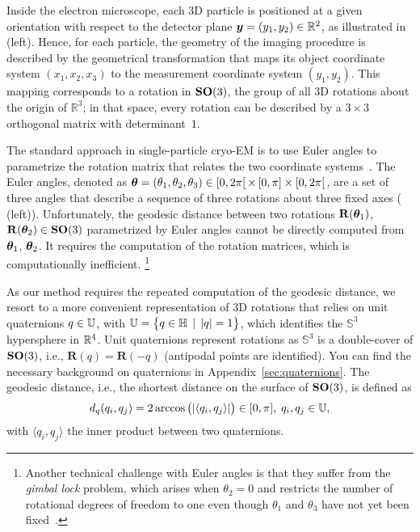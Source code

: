 Inside the electron microscope, each 3D particle is positioned at a given orientation with respect to the detector plane ${\boldsymbol{y}}=(y_1,y_2)\in \mathbb{R}^2$, as illustrated in  (left). Hence, for each particle, the geometry of the imaging procedure is described by the geometrical transformation that maps its object coordinate system $(x_1,x_2,x_3)$ to the measurement coordinate system $(y_1,y_2)$. This mapping corresponds to a rotation in $\mathrm{\mathbf{SO}}(3)$, the group of all 3D rotations about the origin of $\mathbb{R}^3$; in that space, every rotation can be described by a $3\times3$ orthogonal matrix with determinant~$1$.

The standard approach in single-particle cryo-EM is to use Euler angles to parametrize the rotation matrix that relates the two coordinate systems~\cite{sorzano2014interchanging}.
The Euler angles, denoted as ${\boldsymbol{\theta}} = (\theta_1,\theta_2,\theta_3) \in [0,2\pi[ \, \times \, [0,\pi] \times [0,2\pi[$, are a set of three angles that describe a sequence of three rotations about three fixed axes ( (left)).
Unfortunately, the geodesic distance between two rotations $\mathbf{R}({\boldsymbol{\theta}}_1)$, $\mathbf{R}({\boldsymbol{\theta}}_2)\in \mathrm{\mathbf{SO}}(3)$ parametrized by Euler angles cannot be directly computed from ${\boldsymbol{\theta}}_1$, ${\boldsymbol{\theta}}_2$.
It requires the computation of the rotation matrices, which is computationally inefficient.%
\footnote{Another technical challenge with Euler angles is that they suffer from the \textit{gimbal lock} problem, which arises when $\theta_2=0$ and restricts the number of rotational degrees of freedom to one even though $\theta_1$ and $\theta_3$ have not yet been fixed~\cite{koks2006explorations}.}

As our method requires the repeated computation of the geodesic distance, we resort to a more convenient representation of 3D rotations that relies on unit quaternions $q \in \mathbb{U}$, with  $\mathbb{U} = \big\{ q \in \mathbb{H} \; \, | \; \, \lvert q \rvert = 1 \big\}$, which identifies the $\mathbb{S}^3$ hypersphere in $\mathbb{R}^4$.
Unit quaternions represent rotations as $\mathbb{S}^3$ is a double-cover of $\mathrm{\mathbf{SO}}(3)$, i.e., $\mathbf{R}(q) = \mathbf{R}(-q)$ (antipodal points are identified).
You can find the necessary background on quaternions in Appendix~\ref{sec:quaternions}.
The geodesic distance, i.e., the shortest distance on the surface of $\mathrm{\mathbf{SO}}(3)$, is defined as
\begin{equation}
    d_q(q_i, q_j) = 2 \arccos \big(| \langle q_i, q_j \rangle| \big) \in [0,\pi], \; q_i, q_j \in \mathbb{U},
    \label{eqn:distance:orientations}
\end{equation}
with $\langle q_i, q_j \rangle$ the inner product between two quaternions.

